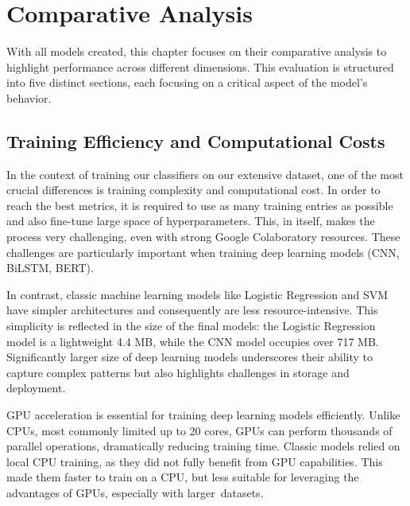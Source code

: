 \chapter{Comparative Analysis}
\label{06_Comparative_Analysis}
\thispagestyle{empty}

With all models created, this chapter focuses on their comparative analysis to highlight performance across different dimensions. This evaluation is structured into five distinct sections, each focusing on a critical aspect of the model's behavior.

\section{Training Efficiency and Computational Costs}

In the context of training our classifiers on our extensive dataset, one of the most crucial differences is training complexity and computational cost. In order to reach the best metrics, it is required to use as many training entries as possible and also fine-tune large space of hyperparameters. This, in itself, makes the process very challenging, even with strong Google Colaboratory resources. These challenges are particularly important when training deep learning models (CNN, BiLSTM, BERT).

\vspace{3mm}

In contrast, classic machine learning models like Logistic Regression and SVM have simpler architectures and consequently are less resource-intensive. This simplicity is reflected in the size of the final models: the Logistic Regression model is a lightweight 4.4 MB, while the CNN model occupies over 717 MB. Significantly larger size of deep learning models underscores their ability to capture complex patterns but also highlights challenges in storage and deployment.

\vspace{3mm}

GPU acceleration is essential for training deep learning models efficiently. Unlike CPUs, most commonly limited up to 20 cores, GPUs can perform thousands of parallel operations, dramatically reducing training time. Classic models relied on local CPU training, as they did not fully benefit from GPU capabilities. This made them faster to train on a CPU, but less suitable for leveraging the advantages of GPUs, especially with larger~datasets. 

\vspace{3mm}

